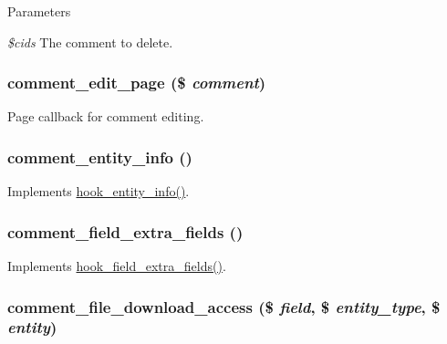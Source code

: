 \begin{DoxyParams}{Parameters}
\item[{\em \$cids}]The comment to delete. \end{DoxyParams}
\hypertarget{comment_8module_aaa18c174bbfaca41a522bf30fa17cffa}{
\subsubsection[{comment\_\-edit\_\-page}]{\setlength{\rightskip}{0pt plus 5cm}comment\_\-edit\_\-page (\$ {\em comment})}}
\label{comment_8module_aaa18c174bbfaca41a522bf30fa17cffa}
Page callback for comment editing. \hypertarget{comment_8module_a4cdb7636ced52ebf5d0af7dd42ca83d1}{
\subsubsection[{comment\_\-entity\_\-info}]{\setlength{\rightskip}{0pt plus 5cm}comment\_\-entity\_\-info ()}}
\label{comment_8module_a4cdb7636ced52ebf5d0af7dd42ca83d1}
Implements \hyperlink{group__hooks_gaf02318e9d0e8cdbf6d187b271b9969a8}{hook\_\-entity\_\-info()}. \hypertarget{comment_8module_ae1d74e0f7764e4be5fa2fa6d66b12e3c}{
\subsubsection[{comment\_\-field\_\-extra\_\-fields}]{\setlength{\rightskip}{0pt plus 5cm}comment\_\-field\_\-extra\_\-fields ()}}
\label{comment_8module_ae1d74e0f7764e4be5fa2fa6d66b12e3c}
Implements \hyperlink{group__hooks_ga7100332aa5b4d5f6ba72534599d133e5}{hook\_\-field\_\-extra\_\-fields()}. \hypertarget{comment_8module_a5632b449cf518ee83511f74ac061c644}{
\subsubsection[{comment\_\-file\_\-download\_\-access}]{\setlength{\rightskip}{0pt plus 5cm}comment\_\-file\_\-download\_\-access (\$ {\em field}, \/  \$ {\em entity\_\-type}, \/  \$ {\em entity})}}

